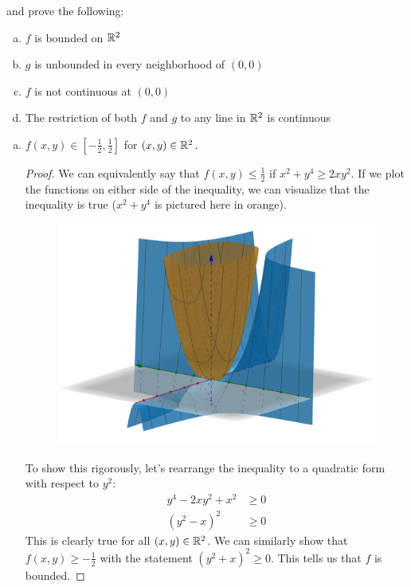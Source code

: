\documentclass{article}
\begin{document}
\begin{enumerate}
and prove the following:
\begin{enumerate}[a.]
\item $f$ is bounded on $\mathbb{R}^2$
\item $g$ is unbounded in every neighborhood of $(0, 0)$
\item $f$ is not continuous at $(0, 0)$
\item The restriction of both $f$ and $g$ to any line in $\mathbb{R}^2$ is continuous
\end{enumerate}

\qquad

\begin{enumerate}[a.]
\newcommand{\Boundary}{\frac{1}{2}}

\item \claim $f(x, y) \in [-\Boundary, \Boundary]$
      for $(x, y) \in \mathbb{R}^2$.
\begin{proof}
We can equivalently say that $f(x,y) \leq \Boundary$ if $x^2 + y^4 \geq 2xy^2$.
If we plot the functions on either side of the inequality, we can visualize
that the inequality is true ($x^2 + y^4$ is pictured here in orange).

\begin{figure}[h]
\includegraphics[scale=0.1]{figure-04-07-a}
\centering
\end{figure}

To show this rigorously, let's rearrange the inequality to a quadratic form with
respect to $y^2$:
\begin{equation*}
\begin{split}
y^4 - 2xy^2 + x^2 &\geq 0 \\
      (y^2 - x)^2 &\geq 0
\end{split}
\end{equation*}
This is clearly true for all $(x, y) \in \mathbb{R}^2$. We can similarly show that
$f(x, y) \geq -\Boundary$ with the statement $(y^2 + x)^2 \geq 0$. This tells
us that $f$ is bounded.

\end{proof}

\end{enumerate}
        
\end{enumerate}
\end{document}
